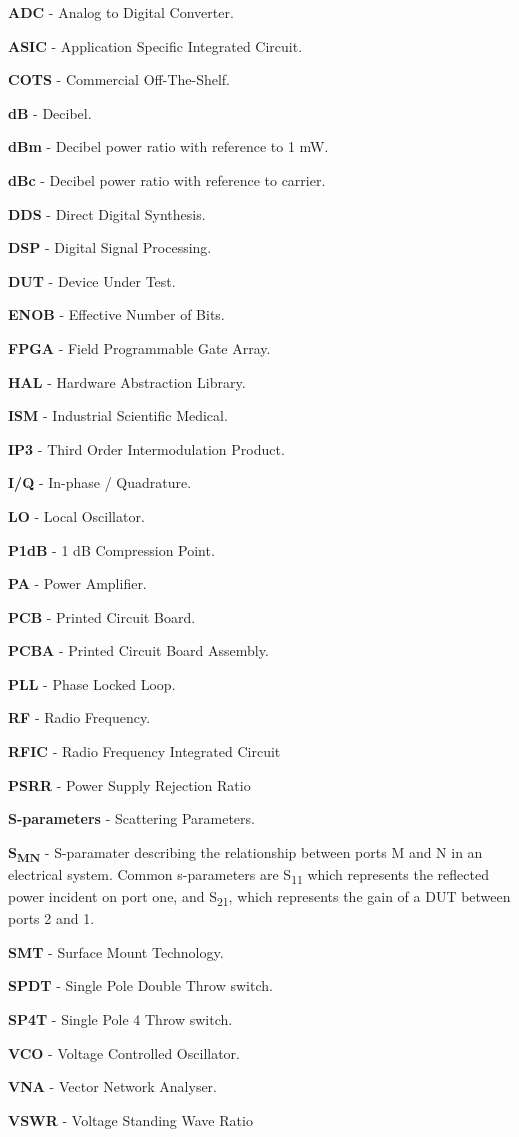 \textbf{ADC} - Analog to Digital Converter.

\textbf{ASIC} - Application Specific Integrated Circuit.

\textbf{COTS} - Commercial Off-The-Shelf.

\textbf{dB} - Decibel.

\textbf{dBm} - Decibel power ratio with reference to 1 mW.

\textbf{dBc} - Decibel power ratio with reference to carrier.

\textbf{DDS} - Direct Digital Synthesis. 

\textbf{DSP} - Digital Signal Processing.

\textbf{DUT} - Device Under Test. 

\textbf{ENOB} - Effective Number of Bits.

\textbf{FPGA} - Field Programmable Gate Array.

\textbf{HAL} - Hardware Abstraction Library.

\textbf{ISM} - Industrial Scientific Medical.

\textbf{IP3} - Third Order Intermodulation Product.

\textbf{I/Q} - In-phase / Quadrature. 

\textbf{LO} - Local Oscillator. 

\textbf{P1dB} - 1 dB Compression Point. 

\textbf{PA} - Power Amplifier.

\textbf{PCB} - Printed Circuit Board. 

\textbf{PCBA} - Printed Circuit Board Assembly.

\textbf{PLL} - Phase Locked Loop.

\textbf{RF} - Radio Frequency.

\textbf{RFIC} - Radio Frequency Integrated Circuit

\textbf{PSRR} - Power Supply Rejection Ratio

\textbf{S-parameters} - Scattering Parameters.

\textbf{S\textsubscript{MN}} - S-paramater describing the relationship between ports M and N in an electrical system. Common s-parameters are S\textsubscript{11} which represents the reflected power incident on port one, and S\textsubscript{21}, which represents the gain of a DUT between ports 2 and 1. 

\textbf{SMT} - Surface Mount Technology.

\textbf{SPDT} - Single Pole Double Throw switch. 

\textbf{SP4T} - Single Pole 4 Throw switch. 

\textbf{VCO} - Voltage Controlled Oscillator.

\textbf{VNA} - Vector Network Analyser. 

\textbf{VSWR} - Voltage Standing Wave Ratio
